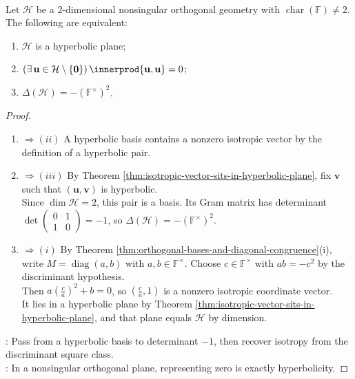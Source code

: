 \begin{proposition} \label{prop:hyperbolic-plane-orthogonal-criteria} \\
Let $\mathcal{H}$ be a $2$-dimensional nonsingular orthogonal geometry with $\operatorname{char}(\mathbb{F})\neq2$. The following are equivalent:
\begin{enumerate}[label=(\roman*)]
\setlength{\itemsep}{0pt}
\item $\mathcal{H}$ is a hyperbolic plane;
\item $(\exists\,\mathbf{u}\in\mathcal{H}\setminus\{\mathbf{0}\})\,\innerprod{\mathbf{u},\mathbf{u}}=0$;
\item $\Delta(\mathcal{H})=-(\mathbb{F}^{\times})^2$.
\end{enumerate}
\begin{proof}
\begin{enumerate}[label=(\roman*)]
\setlength{\itemsep}{0pt}
\item[$(i)$] $\Rightarrow (ii)$ A hyperbolic basis contains a nonzero isotropic vector by the definition of a hyperbolic pair.
\item[$(ii)$] $\Rightarrow (iii)$ By Theorem \ref{thm:isotropic-vector-sits-in-hyperbolic-plane}, fix $\mathbf{v}$ such that $(\mathbf{u},\mathbf{v})$ is hyperbolic.\\
Since $\dim\mathcal{H}=2$, this pair is a basis. Its Gram matrix has determinant $\det\left(\begin{smallmatrix}0&1\\1&0\end{smallmatrix}\right)=-1$, so $\Delta(\mathcal{H})=-(\mathbb{F}^{\times})^2$.
\item[$(iii)$] $\Rightarrow (i)$ By Theorem \ref{thm:orthogonal-bases-and-diagonal-congruence}(i), write $M=\operatorname{diag}(a,b)$ with $a,b\in\mathbb{F}^{\times}$. Choose $c\in\mathbb{F}^{\times}$ with $ab=-c^2$ by the discriminant hypothesis.\\
Then $a\left(\frac{c}{a}\right)^2+b=0$, so $\left(\frac{c}{a},1\right)$ is a nonzero isotropic coordinate vector.\\
It lies in a hyperbolic plane by Theorem \ref{thm:isotropic-vector-sits-in-hyperbolic-plane}, and that plane equals $\mathcal{H}$ by dimension.
\end{enumerate}
: Pass from a hyperbolic basis to determinant $-1$, then recover isotropy from the discriminant square class.\\
: In a nonsingular orthogonal plane, representing zero is exactly hyperbolicity.
\end{proof}
\end{proposition}

